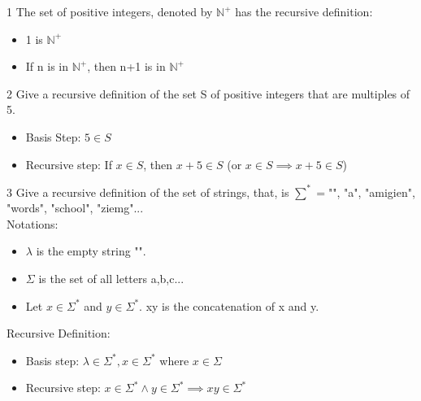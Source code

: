 \documentclass[12pt, letterpaper]{article}
\newcommand{\exheader}[1][ex]{{\tiny{#1}\normalsize}}
\begin{document}
\exheader[1] The set of positive integers, denoted by $\mathbb{N}^+$ has the recursive definition:
\begin{itemize}[leftmargin=*, label={}]
	\item 1 is $\mathbb{N}^+$
	\item If n is in $\mathbb{N}^+$, then n+1 is in $\mathbb{N}^+$
\end{itemize}

\bigbreak

\exheader[2] Give a recursive definition of the set S of positive integers that are multiples of 5.
\begin{itemize}[leftmargin=*, label={}]
	\item Basis Step: $5 \in S$
	\item Recursive step: If $x \in S$, then $x+5 \in S$ (or $x \in S \implies x + 5 \in S$)
\end{itemize}

\bigbreak

\exheader[3] Give a recursive definition of the set of strings, that, is $\sum^* = ${"", "a", "amigien", "words", "school", "ziemg"...} \\ 
Notations: 
\begin{itemize}[leftmargin=*, label={}]
	\item $\lambda$ is the empty string "".
	\item $\Sigma$ is the set of all letters {a,b,c...}
	\item Let $x \in \Sigma^*$ and $y \in \Sigma^*$. xy is the concatenation of x and y.
\end{itemize}
Recursive Definition:
\begin{itemize}[leftmargin=*, label={}]
	\item Basis step: $\lambda \in \Sigma^*, x \in \Sigma^*$ where $x \in \Sigma$
	\item Recursive step: $x \in \Sigma^* \land y \in \Sigma^* \implies xy \in \Sigma^*$
\end{itemize}
\bigbreak
{}
\end{document}
